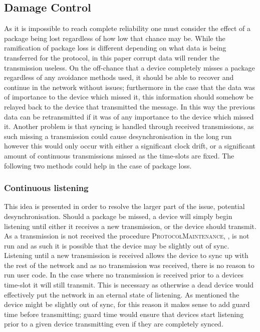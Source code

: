 \subsection{Damage Control}
As it is impossible to reach complete reliability one must consider the effect of a package being lost regardless of how low that chance may be.
While the ramification of package loss is different depending on what data is being transferred for the protocol, in this paper corrupt data will render the transmission useless.
On the off-chance that a device completely misses a package regardless of any avoidance methods used, it should be able to recover and continue in the network without issues; furthermore in the case that the data was of importance to the device which missed it, this information should somehow be relayed back to the device that transmitted the message.
In this way the previous data can be retransmitted if it was of any importance to the device which missed it.
Another problem is that syncing is handled through received transmissions, as such missing a transmission could cause desynchronisation in the long run however this would only occur with either a significant clock drift, or a significant amount of continuous transmissions missed as the time-slots are fixed.
The following two methods could help in the case of package loss.

\subsubsection*{Continuous listening}\label{contListen}
This idea is presented in order to resolve the larger part of the issue, potential desynchronisation.
Should a package be missed, a device will simply begin listening until either it receives a new transmission, or the device should transmit.
As a transmission is not received the procedure \textsc{ProtocolMaintenance}, , is not run and as such it is possible that the device may be slightly out of sync.
Listening until a new transmission is received allows the device to sync up with the rest of the network and as no transmission was received, there is no reason to run user code.
In the case where no transmission is received prior to a devices time-slot it will still transmit.
This is necessary as otherwise a dead device would effectively put the network in an eternal state of listening.
As mentioned the device might be slightly out of sync, for this reason it makes sense to add guard time before transmitting; guard time would ensure that devices start listening prior to a given device transmitting even if they are completely synced.

